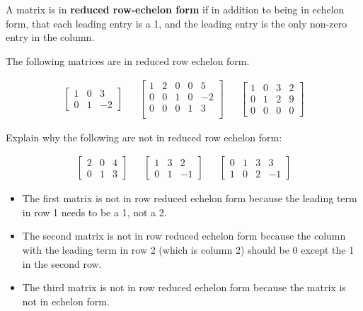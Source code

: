 \begin{definition}
A matrix is in \textbf{reduced row-echelon form} if in addition to being in echelon form, that each leading entry is a 1, and the leading entry is the only non-zero entry in the column.
\end{definition}

\phantom{Empty Text}

\begin{example}
The following matrices are in reduced row echelon form.

\begin{align*}
\begin{bmatrix}
1 & 0 & 3 \\
0 & 1 & -2
\end{bmatrix} &&
\begin{bmatrix}
1 & 2 & 0 & 0 & 5 \\
0 & 0 & 1 & 0 & -2 \\
0 & 0 & 0 & 1 & 3 \\
\end{bmatrix} &&
\begin{bmatrix}
1 & 0 & 3 & 2 \\
0 & 1 & 2 & 9 \\
0 & 0 & 0 & 0
\end{bmatrix}
\end{align*}
\end{example}

\begin{example}
Explain why the following are not in reduced row echelon form:

\begin{align*}
\begin{bmatrix}
2 & 0 & 4 \\
0 & 1 & 3
\end{bmatrix} &&
\begin{bmatrix}
1 & 3 & 2 \\
0 & 1 & -1
\end{bmatrix} &&
\begin{bmatrix}
0 & 1 & 3 & 3 \\
1 & 0 & 2 & -1
\end{bmatrix}
\end{align*}

\solution

\begin{itemize}
\item The first matrix is not in row reduced echelon form because the leading term in row 1 needs to be a 1, not a 2.
\item The second matrix is not in row reduced echelon form because the column with the leading term in row 2 (which is column 2) should be 0 except the 1 in the second row.
\item The third matrix is not in row reduced echelon form because the matrix is not in echelon form.
\end{itemize}
\end{example}

